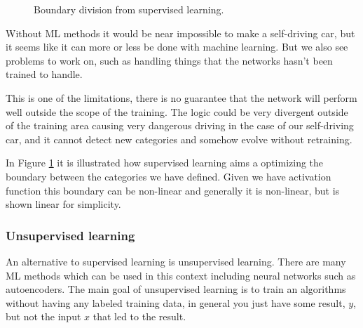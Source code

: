 \documentclass[12pt,a4paper]{article} %
\numberwithin{equation}{section}
\begin{document}
			\begin{figure}
				\centering
				\caption{Boundary division from supervised learning.}
				\label{fig:supervised}
			\end{figure}
			Without ML methods it would be near impossible to make a self-driving car, but it seems like it can more or less be done with machine learning. But we also see problems to work on, such as handling things that the networks hasn't been trained to handle.
			
			This is one of the limitations, there is no guarantee that the network will perform well outside the scope of the training. The logic could be very divergent outside of the training area causing very dangerous driving in the case of our self-driving car, and it cannot detect new categories and somehow evolve without retraining.	
		
			In Figure \ref{fig:supervised} it is illustrated how supervised learning aims a optimizing the boundary between the categories we have defined. Given we have activation function this boundary can be non-linear and generally it is non-linear, but is shown linear for simplicity.
				
		\subsubsection{Unsupervised learning}
			An alternative to supervised learning is unsupervised learning. There are many ML methods which can be used in this context including neural networks such as autoencoders. The main goal of unsupervised learning is to train an algorithms without having any labeled training data, in general you just have some result, $y$, but not the input $x$ that led to the result.
			
\end{document}
